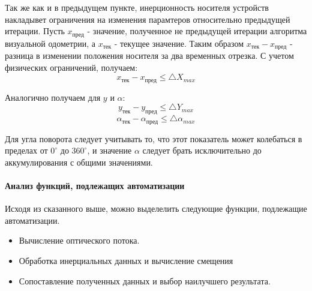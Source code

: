 \begin{enumerate}
Так же как и в предыдущем пункте, инерционность носителя устройств накладывет ограничения на изменения парамтеров относительно предыдущей итерации. 
Пусть $x_{пред}$ - значение, полученное не предыдущей итерации алгоритма визуальной одометрии, а  $x_{тек}$ - текущее значение. 
Таким образом $ x_{тек} - x_{пред}$ - разница в изменении положения носителя за два временных отрезка. 
С учетом физических ограничений, получаем:
$$ x_{тек} - x_{пред} \leq \bigtriangleup X_{max}$$

Аналогично получаем для $y$ и $\alpha$:
$$ y_{тек} - y_{пред} \leq \bigtriangleup Y_{max}$$
$$ \alpha_{тек} - \alpha_{пред} \leq \bigtriangleup \alpha_{max}$$

Для угла поворота следует учитывать то, что этот показатель может колебаться в пределах от $0^\circ$ до $360^\circ$, и значение $\alpha$ следует брать исключительно до аккумулирования с общими значениями.  
\end{enumerate}


\paragraph{Анализ функций, подлежащих автоматизации}
Исходя из сказанного выше, можно выделелить следующие функции, подлежащие автоматизации.
\begin{itemize}
\item Вычисление оптического потока.
\item Обработка инерциальных данных и вычисление смещения
\item Сопоставление полученных данных и выбор наилучшего результата. 
\end{itemize}

